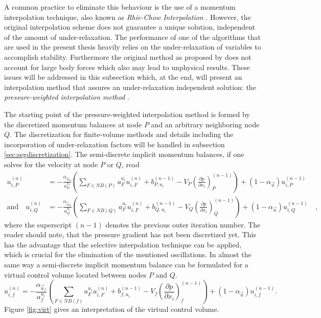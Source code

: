 A common practice to eliminate this behaviour is the use of a momentum interpolation technique, also known as \emph{Rhie-Chow Interpolation} \cite{rhie82}. However, the original interpolation scheme does not guarantee a unique solution, independent of the amount of under-relaxation. The performance of one of the algorithms that are used in the present thesis heavily relies on the under-relaxation of variables to accomplish stability. Furthermore the original method as proposed by \cite{rhie82} does not account for large body forces which also may lead to unphysical results. These issues will be addressed in this subsection which, at the end, will present an interpolation method that assures an under-relaxation independent solution: the \emph{pressure-weighted interpolation method} \cite{miller88}.

The starting point of the pressure-weighted interpolation method is formed by the discretized momentum balances at node \(P\) and an arbitrary neighboring node \(Q\). The discretization for finite-volume methods and details including the incorporation of under-relaxation factors will be handled in subsection \ref{sec:segdiscretization}. The semi-discrete implicit momentum balances, if one solves for the velocity at node \(P\) or \(Q\), read
\begin{align*}
    u_{i,P}^{(n)} 
    &= 
    - \frac{\alpha_{\vec{u}_P}}{a_P^{u_i}} \left(\sum_{F \in NB(P)} a_F^{u_i} u_{i,F}^{(n)}
    +                                     b_{P,u_i}^{(n-1)} 
    -                                     V_P\left(\frac{\partial p}{\partial x_i}\right)_P^{(n-1)} \right)
    + \left(1 - \alpha_{\vec{u}}\right) u_{i,P}^{(n-1)}  \\[1em]
    \text{and} \quad
    u_{i,Q}^{(n)} 
    &= 
    - \frac{\alpha_{\vec{u}_Q}}{a_Q^{u_i}} \left(\sum_{F \in NB(Q)} a_F^{u_i} u_{i,F}^{(n)}
    +                                     b_{Q,u_i}^{(n-1)} 
    -                                     V_Q\left(\frac{\partial p}{\partial x_i}\right)_Q^{(n-1)}   \right)
    + \left(1 - \alpha_{\vec{u}}\right) u_{i,Q}^{(n-1)} \quad,
\end{align*}
where the superscript \((n-1)\) denotes the previous outer iteration number. The reader should note, that the pressure gradient has not been discretized yet. This has the advantage that the selective interpolation technique \cite{schaefer99} can be applied, which is crucial for the elimination of the mentioned oscillations. In almost the same way a semi-discrete implicit momentum balance can be formulated for a virtual control volume located between nodes \(P\) and \(Q\). \begin{equation}
  \label{eq:virtualu}
  u_{i,f}^{(n)} 
  = 
  - \frac{\alpha_{\vec{u}_f}}{a_f^{u_i}} \left(\sum_{F \in NB(f)} a_F^{u_i} u_{i,F}^{(n)} 
  +                                     b_{f,u_i}^{(n-1)} 
  -                                     V_f\left(\frac{\partial p}{\partial x_i}\right)_f^{(n-1)}  \right)
  + \left(1 - \alpha_{\vec{u}}\right) u_{i,f}^{(n-1)}.
\end{equation}
Figure \ref{fig:virt} gives an interpretation of the virtual control volume.

